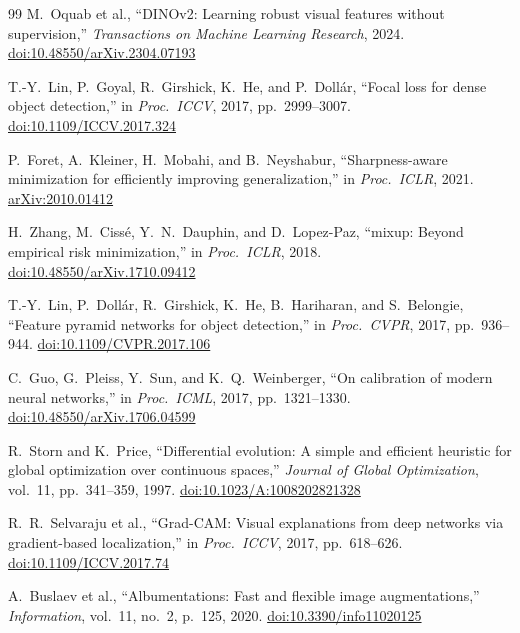 \documentclass[10pt,twocolumn]{article}
\begin{document}
\begin{thebibliography}{99}
M.~Oquab et al.,
``DINOv2: Learning robust visual features without supervision,''
\textit{Transactions on Machine Learning Research}, 2024.
\href{https://doi.org/10.48550/arXiv.2304.07193}{doi:10.48550/arXiv.2304.07193}

T.-Y.~Lin, P.~Goyal, R.~Girshick, K.~He, and P.~Doll\'ar,
``Focal loss for dense object detection,''
in \textit{Proc.\ ICCV}, 2017, pp.~2999--3007.
\href{https://doi.org/10.1109/ICCV.2017.324}{doi:10.1109/ICCV.2017.324}

P.~Foret, A.~Kleiner, H.~Mobahi, and B.~Neyshabur,
``Sharpness-aware minimization for efficiently improving generalization,''
in \textit{Proc.\ ICLR}, 2021.
\href{https://arxiv.org/abs/2010.01412}{arXiv:2010.01412}

H.~Zhang, M.~Ciss\'e, Y.~N.~Dauphin, and D.~Lopez-Paz,
``mixup: Beyond empirical risk minimization,''
in \textit{Proc.\ ICLR}, 2018.
\href{https://doi.org/10.48550/arXiv.1710.09412}{doi:10.48550/arXiv.1710.09412}

T.-Y.~Lin, P.~Doll\'ar, R.~Girshick, K.~He, B.~Hariharan, and S.~Belongie,
``Feature pyramid networks for object detection,''
in \textit{Proc.\ CVPR}, 2017, pp.~936--944.
\href{https://doi.org/10.1109/CVPR.2017.106}{doi:10.1109/CVPR.2017.106}

C.~Guo, G.~Pleiss, Y.~Sun, and K.~Q.~Weinberger,
``On calibration of modern neural networks,''
in \textit{Proc.\ ICML}, 2017, pp.~1321--1330.
\href{https://doi.org/10.48550/arXiv.1706.04599}{doi:10.48550/arXiv.1706.04599}

R.~Storn and K.~Price,
``Differential evolution: A simple and efficient heuristic for global optimization over continuous spaces,''
\textit{Journal of Global Optimization}, vol.~11, pp.~341--359, 1997.
\href{https://doi.org/10.1023/A:1008202821328}{doi:10.1023/A:1008202821328}

R.~R.~Selvaraju et al.,
``Grad-CAM: Visual explanations from deep networks via gradient-based localization,''
in \textit{Proc.\ ICCV}, 2017, pp.~618--626.
\href{https://doi.org/10.1109/ICCV.2017.74}{doi:10.1109/ICCV.2017.74}

A.~Buslaev et al.,
``Albumentations: Fast and flexible image augmentations,''
\textit{Information}, vol.~11, no.~2, p.~125, 2020.
\href{https://doi.org/10.3390/info11020125}{doi:10.3390/info11020125}

\end{thebibliography}
\end{document}
